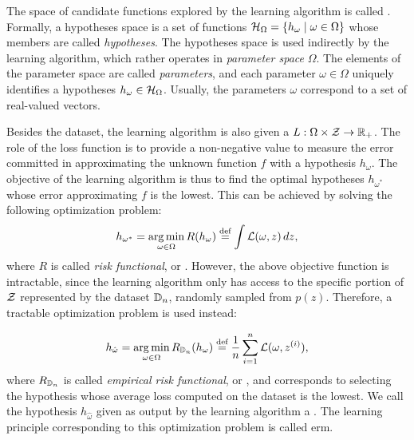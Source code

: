The space of candidate functions explored by the learning algorithm is called . Formally, a hypotheses space is a set of functions $\HypSpace = \Set{h_{\omega} \mid \omega \in \Omega}$ whose members are called \emph{hypotheses}. The hypotheses space is used indirectly by the learning algorithm, which rather operates in \emph{parameter space} $\Omega$. The elements of the parameter space are called \emph{parameters}, and each parameter $\omega \in \Omega$ uniquely identifies a hypotheses $h_{\omega} \in \HypSpace$. Usually, the parameters $\omega$ correspond to a set of real-valued vectors. 

Besides the dataset, the learning algorithm is also given a  $L: \Omega \times \Cal{Z} \shortrightarrow \Real_+$. The role of the loss function is to provide a non-negative value to measure the error committed in approximating the unknown function $f$ with a hypothesis $h_{\omega}$. The objective of the learning algorithm is thus to find the optimal hypotheses $h_{\omega^*}$ whose error approximating $f$ is the lowest. This can be achieved by solving the following optimization problem:
$$h_{\omega^*} = \argmin_{\omega \in \Omega} R(h_{\omega}) \defeq \int \Loss(\omega, z)\, dz,$$
where $R$ is called \emph{risk functional}, or . However, the above objective function is intractable, since the learning algorithm only has access to the specific portion of $\Cal{Z}$ represented by the dataset $\mathbb{D}_n$, randomly sampled from $p(z)$. Therefore, a tractable optimization problem is used instead:

$$h_{\hat{\omega}} = \argmin_{\omega \in \Omega} R_{\Data_n}(h_{\omega}) \defeq \frac{1}{n} \sum_{i=1}^n \Loss(\omega, \Pattern{z}{i}),$$
where $R_{\mathbb{D}_n}$ is called \emph{empirical risk functional}, or
, and corresponds to selecting the hypothesis
whose average loss computed on the dataset is the lowest. We call the hypothesis $h_{\hat{\omega}}$ given as output by the learning algorithm a . The learning principle corresponding to this optimization problem is called \gls{erm}. 

